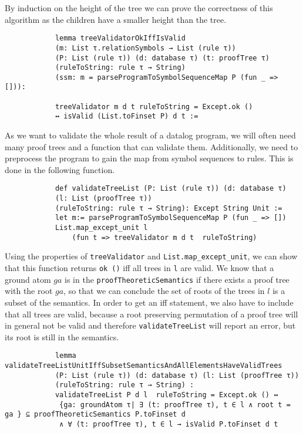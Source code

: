 \documentclass{article}
\begin{document}
        By induction on the height of the tree we can prove the correctness of this algorithm as the children have a smaller height than the tree.
        
        \begin{lstlisting}
            lemma treeValidatorOkIffIsValid 
            (m: List τ.relationSymbols → List (rule τ)) 
            (P: List (rule τ)) (d: database τ) (t: proofTree τ) 
            (ruleToString: rule τ → String) 
            (ssm: m = parseProgramToSymbolSequenceMap P (fun _ => [])): 
            
            treeValidator m d t ruleToString = Except.ok () 
            ↔ isValid (List.toFinset P) d t :=

        \end{lstlisting}

        As we want to validate the whole result of a datalog program, we will often need many proof trees and a function that can validate them. Additionally, we need to preprocess the program to gain the map from symbol sequences to rules. This is done in the following function.
        
        \begin{lstlisting}
            def validateTreeList (P: List (rule τ)) (d: database τ) 
            (l: List (proofTree τ)) 
            (ruleToString: rule τ → String): Except String Unit :=
            let m:= parseProgramToSymbolSequenceMap P (fun _ => [])
            List.map_except_unit l 
                (fun t => treeValidator m d t  ruleToString)

        \end{lstlisting}

        Using the properties of \texttt{treeValidator} and \texttt{List.map\_except\_unit}, we can show that this function returns \texttt{ok ()} iff all trees in \texttt{l} are valid. We know that a ground atom $ga$ is in the \texttt{proofTheoreticSemantics} if there exists a proof tree with the root $ga$, so that we can conclude the set of roots of the trees in $l$ is a subset of the semantics. In order to get an iff statement, we also have to include that all trees are valid, because a root preserving permutation of a proof tree will in general not be valid and therefore \texttt{validateTreeList} will report an error, but its root is still in the semantics.

        \begin{lstlisting}
            lemma validateTreeListUnitIffSubsetSemanticsAndAllElementsHaveValidTrees 
            (P: List (rule τ)) (d: database τ) (l: List (proofTree τ)) 
            (ruleToString: rule τ → String) : 
            validateTreeList P d l  ruleToString = Except.ok () ↔ 
             {ga: groundAtom τ| ∃ (t: proofTree τ), t ∈ l ∧ root t = ga } ⊆ proofTheoreticSemantics P.toFinset d 
             ∧ ∀ (t: proofTree τ), t ∈ l → isValid P.toFinset d t
        \end{lstlisting}
\end{document}
